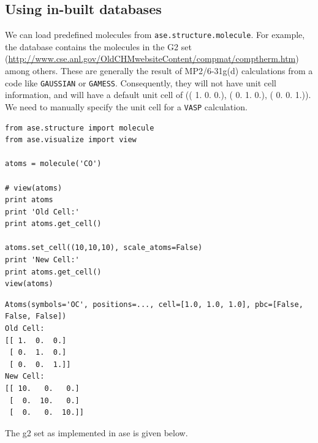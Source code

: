 \documentclass[11pt]{article}
\begin{document}
\subsection{Using in-built databases}
\label{sec-4-2}

We can load predefined molecules from \verb~ase.structure.molecule~. For example, the database contains the molecules in the G2 set (\url{http://www.cse.anl.gov/OldCHMwebsiteContent/compmat/comptherm.htm}) among others. These are generally the result of MP2/6-31g(d) calculations from a code like \texttt{GAUSSIAN} or \texttt{GAMESS}. Consequently, they will not have unit cell information, and will have a default unit cell of  (( 1.  0.  0.), ( 0.  1.  0.), ( 0.  0.  1.)). We need to manually specify the unit cell for a \texttt{VASP} calculation.

\begin{verbatim}
from ase.structure import molecule
from ase.visualize import view

atoms = molecule('CO')

# view(atoms)
print atoms
print 'Old Cell:'
print atoms.get_cell()

atoms.set_cell((10,10,10), scale_atoms=False)
print 'New Cell:'
print atoms.get_cell()
view(atoms)
\end{verbatim}

\begin{verbatim}
Atoms(symbols='OC', positions=..., cell=[1.0, 1.0, 1.0], pbc=[False, False, False])
Old Cell:
[[ 1.  0.  0.]
 [ 0.  1.  0.]
 [ 0.  0.  1.]]
New Cell:
[[ 10.   0.   0.]
 [  0.  10.   0.]
 [  0.   0.  10.]]
\end{verbatim}

The g2 set as implemented in ase is given below.
\end{document}
